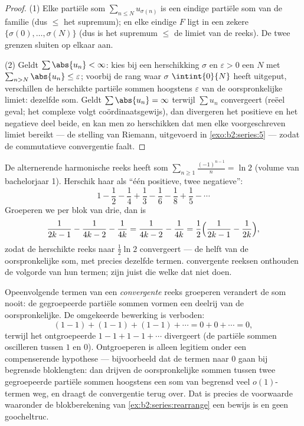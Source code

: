 \begin{proof}
(1) Elke partiële som $\sum_{n \leq N} u_{\sigma(n)}$ is een
eindige partiële som van de familie (dus $\leq$ het supremum); en
elke eindige $F$ ligt in een zekere $\{\sigma(0), \dots,
\sigma(N)\}$ (dus is het supremum $\leq$ de limiet van de reeks).
De twee grenzen sluiten op elkaar aan.

(2) Geldt $\sum\abs{u_n} < \infty$: kies bij een herschikking
$\sigma$ en $\varepsilon > 0$ een $N$ met $\sum_{n >
N}\abs{u_n} \leq \varepsilon$; voorbij de rang waar $\sigma$
$\intint{0}{N}$ heeft uitgeput, verschillen de herschikte partiële
sommen hoogstens $\varepsilon$ van de oorspronkelijke limiet:
dezelfde som. Geldt $\sum \abs{u_n} = \infty$ terwijl $\sum u_n$
convergeert (reëel geval; het complexe volgt coördinaatsgewijs),
dan divergeren het positieve en het negatieve deel beide, en kan
men zo herschikken dat men elke voorgeschreven limiet bereikt ---
de stelling van Riemann, uitgevoerd in \cref{exo:b2:series:5} ---
zodat de commutatieve convergentie faalt.
\end{proof}

\begin{example}\label{ex:b2:series:rearrange}
De alternerende harmonische reeks heeft som
$\sum_{n\geq1}\frac{(-1)^{n-1}}{n} = \ln 2$ (volume van
bachelorjaar 1). Herschik haar als ``één positieve, twee
negatieve'':
\[
1 - \frac12 - \frac14 + \frac13 - \frac16 - \frac18 + \frac15 -
\cdots
\]
Groeperen we per blok van drie, dan is
\[
\frac{1}{2k-1} - \frac{1}{4k-2} - \frac1{4k}
= \frac{1}{4k-2} - \frac{1}{4k}
= \frac12\Bigl(\frac{1}{2k-1} - \frac1{2k}\Bigr),
\]
zodat de herschikte reeks naar $\frac12\ln 2$ convergeert --- de
helft van de oorspronkelijke som, met precies dezelfde termen.
 convergente reeksen onthouden de volgorde van hun
termen;  zijn juist die welke dat niet doen.
\end{example}

\begin{example}\label{ex:b2:series:grouping}
Opeenvolgende termen van een \emph{convergente} reeks groeperen
verandert de som nooit: de gegroepeerde partiële sommen vormen een
deelrij van de oorspronkelijke. De omgekeerde bewerking is
verboden:
\[
(1 - 1) + (1 - 1) + (1 - 1) + \cdots = 0 + 0 + \cdots = 0,
\]
terwijl het ontgroepeerde $1 - 1 + 1 - 1 + \cdots$ divergeert (de
partiële sommen oscilleren tussen $1$ en $0$). Ontgroeperen is
alleen legitiem onder een compenserende hypothese --- bijvoorbeeld
dat de termen naar $0$ gaan bij begrensde bloklengten: dan drijven
de oorspronkelijke sommen tussen twee gegroepeerde partiële sommen
hoogstens een som van begrensd veel $o(1)$-termen weg, en draagt de
convergentie terug over. Dat is precies de voorwaarde waaronder de
blokberekening van \cref{ex:b2:series:rearrange} een bewijs is en
geen goocheltruc.
\end{example}

